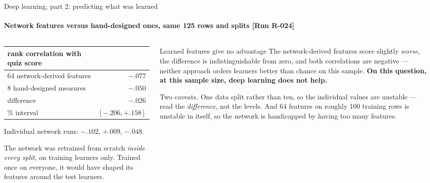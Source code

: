 \documentclass[aspectratio=169,10pt]{beamer}
\makeatletter
\newcommand{\runtag}[1]{{\scriptsize\color{mubeamer@gray7}[#1]}}
\newcommand{\sidenote}[1]{{\scriptsize\color{mubeamer@gray7}\sloppy\par#1\par}}
\makeatother
\begin{document}
\begin{frame}{Deep learning, part 2: predicting what was learned}
  \framesubtitle{Network features versus hand-designed ones, same 125 rows and splits \runtag{Run R-024}}
  \begin{columns}[T]
    \begin{column}{0.46\textwidth}
      \scriptsize
      \begin{tabular}{@{}lr@{}}
        \toprule
        rank correlation with quiz score & \\
        \midrule
        64 network-derived features & $\mathbf{-.077}$ \\
        8 hand-designed measures    & $\mathbf{-.050}$ \\
        \midrule
        difference             & $-.026$ \\
        \quad 95\% interval    & $[-.206, +.158]$ \\
        \bottomrule
      \end{tabular}

      \vspace{0.3em}
      {\scriptsize Individual network runs: $-.102$, $+.009$, $-.048$.}

      \vspace{0.5em}
      \sidenote{The network was retrained from scratch \emph{inside every
      split}, on training learners only. Trained once on everyone, it would
      have shaped its features around the test learners.}
    \end{column}
    \begin{column}{0.50\textwidth}
      \begin{block}{Learned features give no advantage}
        \small
        The network-derived features score slightly \emph{worse}, the
        difference is indistinguishable from zero, and both correlations are
        negative --- neither approach orders learners better than chance on
        this sample. \textbf{On this question, at this sample size, deep
        learning does not help.}
      \end{block}
      \sidenote{Two caveats. One data split rather than ten, so the individual
      values are unstable --- read the \emph{difference}, not the levels. And
      64 features on roughly 100 training rows is unstable in itself, so the
      network is handicapped by having too many features.}
    \end{column}
  \end{columns}
\end{frame}
\end{document}
